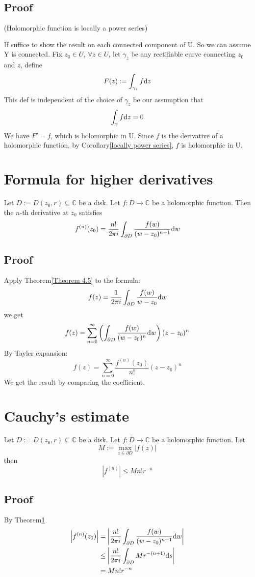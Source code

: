 \documentclass{book}
\newcommand{\abs}[1]{\left\lvert #1 \right\rvert}
\begin{document}
\subsection*{Proof}\label{locally power series}
(Holomorphic function is locally a power series)

If suffice to show the result on each connected component of U. So we can assume Y is connected. Fix $z_0\in U$, $\forall z\in U$, let $\gamma_z$ be any rectifiable curve connecting $z_0$ and $z$, define $$F(z):=\int_{\gamma_z}f\text dz$$
This def is independent of the choice of $\gamma_z$ be our assumption that $$\int_\gamma f\text dz=0$$
We have $F'=f$, which is holomorphic in U. Since $f$ is the derivative of a holomorphic function, by Corollary\ref{locally power series}, $f$ is holomorphic in U.
\section{Formula for higher derivatives}
\label{Formulae for higher derivatives}
Let $D:=D(z_0,r)\subseteq \mathbb C$ be a disk. Let $f:\overline D\to \mathbb C$ be a holomorphic function. Then the $n$-th derivative at $z_0$ satisfies
$$f^{(n)}(z_0)=\frac{n!}{2\pi i}\int_{\partial D}\frac{f(w)}{(w-z_0)^{n+1}}\text dw$$
\subsection*{Proof}
Apply Theorem\ref{Theorem 4.5} to the formula:
$$f(z)=\frac{1}{2\pi i}\int_{\partial D}\frac{f(w)}{w-z_0}\text dw$$
we get
$$f(z)=\sum\limits_{n=0}^\infty\left(\int_{\partial D}\frac{f(w)}{(w-z_0)^n}\text dw\right)(z-z_0)^n$$
By Tayler expansion:
$$f(z)=\sum\limits_{n=0}^\infty\frac{f^{(n)}(z_0)}{n!}(z-z_0)^n$$
We get the result by comparing the coefficient.
\section{Cauchy's estimate}
\label{Cauchy's estimate}
Let $D:=D(z_0,r)\subseteq \mathbb C$ be a disk. Let $f:\overline D\to \mathbb C$ be a holomorphic function. Let $$M:=\max_{z\in \partial D}\abs{f(z)}$$then
$$\abs{f^{(n)}}\leq Mn!r^{-n}$$
\subsection*{Proof}
By Theorem\ref{Formulae for higher derivatives}
$$
\begin{aligned}
    \abs{f^{(n)}(z_0)}&=\abs{\frac{n!}{2\pi i}\int_{\partial D}\frac{f(w)}{(w-z_0)^{n+1}}\text dw}\\
    &\leq\abs{\frac{n!}{2\pi i}\int_{\partial D}Mr^{-(n+1)}\text ds}\\
    &=Mn!r^{-n}
\end{aligned}
$$
\end{document}
